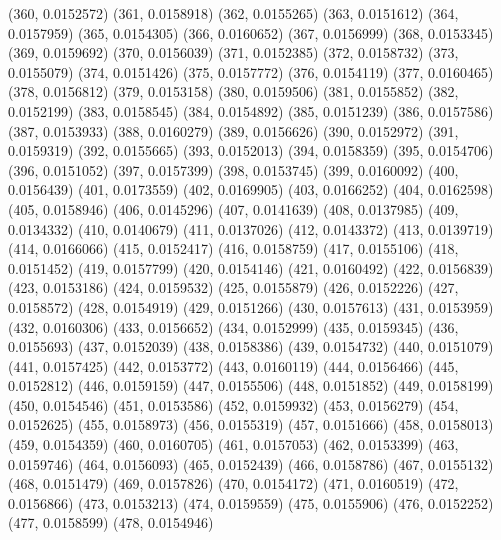{					(360, 0.0152572)
					(361, 0.0158918)
					(362, 0.0155265)
					(363, 0.0151612)
					(364, 0.0157959)
					(365, 0.0154305)
					(366, 0.0160652)
					(367, 0.0156999)
					(368, 0.0153345)
					(369, 0.0159692)
					(370, 0.0156039)
					(371, 0.0152385)
					(372, 0.0158732)
					(373, 0.0155079)
					(374, 0.0151426)
					(375, 0.0157772)
					(376, 0.0154119)
					(377, 0.0160465)
					(378, 0.0156812)
					(379, 0.0153158)
					(380, 0.0159506)
					(381, 0.0155852)
					(382, 0.0152199)
					(383, 0.0158545)
					(384, 0.0154892)
					(385, 0.0151239)
					(386, 0.0157586)
					(387, 0.0153933)
					(388, 0.0160279)
					(389, 0.0156626)
					(390, 0.0152972)
					(391, 0.0159319)
					(392, 0.0155665)
					(393, 0.0152013)
					(394, 0.0158359)
					(395, 0.0154706)
					(396, 0.0151052)
					(397, 0.0157399)
					(398, 0.0153745)
					(399, 0.0160092)
					(400, 0.0156439)
					(401, 0.0173559)
					(402, 0.0169905)
					(403, 0.0166252)
					(404, 0.0162598)
					(405, 0.0158946)
					(406, 0.0145296)
					(407, 0.0141639)
					(408, 0.0137985)
					(409, 0.0134332)
					(410, 0.0140679)
					(411, 0.0137026)
					(412, 0.0143372)
					(413, 0.0139719)
					(414, 0.0166066)
					(415, 0.0152417)
					(416, 0.0158759)
					(417, 0.0155106)
					(418, 0.0151452)
					(419, 0.0157799)
					(420, 0.0154146)
					(421, 0.0160492)
					(422, 0.0156839)
					(423, 0.0153186)
					(424, 0.0159532)
					(425, 0.0155879)
					(426, 0.0152226)
					(427, 0.0158572)
					(428, 0.0154919)
					(429, 0.0151266)
					(430, 0.0157613)
					(431, 0.0153959)
					(432, 0.0160306)
					(433, 0.0156652)
					(434, 0.0152999)
					(435, 0.0159345)
					(436, 0.0155693)
					(437, 0.0152039)
					(438, 0.0158386)
					(439, 0.0154732)
					(440, 0.0151079)
					(441, 0.0157425)
					(442, 0.0153772)
					(443, 0.0160119)
					(444, 0.0156466)
					(445, 0.0152812)
					(446, 0.0159159)
					(447, 0.0155506)
					(448, 0.0151852)
					(449, 0.0158199)
					(450, 0.0154546)
					(451, 0.0153586)
					(452, 0.0159932)
					(453, 0.0156279)
					(454, 0.0152625)
					(455, 0.0158973)
					(456, 0.0155319)
					(457, 0.0151666)
					(458, 0.0158013)
					(459, 0.0154359)
					(460, 0.0160705)
					(461, 0.0157053)
					(462, 0.0153399)
					(463, 0.0159746)
					(464, 0.0156093)
					(465, 0.0152439)
					(466, 0.0158786)
					(467, 0.0155132)
					(468, 0.0151479)
					(469, 0.0157826)
					(470, 0.0154172)
					(471, 0.0160519)
					(472, 0.0156866)
					(473, 0.0153213)
					(474, 0.0159559)
					(475, 0.0155906)
					(476, 0.0152252)
					(477, 0.0158599)
					(478, 0.0154946)
}
